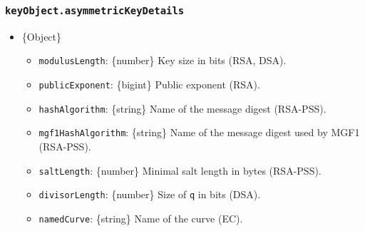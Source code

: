 \begin{Shaded}
\begin{Highlighting}[]
\OperatorTok{=} \NormalTok{(}\NormalTok{)}\OperatorTok{;}
\OperatorTok{=}\OperatorTok{;}

\NormalTok{(} \NormalTok{() \{}
  \OperatorTok{=} \NormalTok{(\{}
    \OperatorTok{:} \OperatorTok{,}
    \OperatorTok{:} \OperatorTok{,}
    \OperatorTok{:} \OperatorTok{,}
\NormalTok{  \}}\OperatorTok{,} \OperatorTok{,}\NormalTok{ [}\OperatorTok{,} \NormalTok{])}\OperatorTok{;}

  \OperatorTok{=}\OperatorTok{;}
  \NormalTok{)}\OperatorTok{;}
\NormalTok{\})()}\OperatorTok{;}
\end{Highlighting}
\end{Shaded}

\subsubsection{\texorpdfstring{\texttt{keyObject.asymmetricKeyDetails}}{keyObject.asymmetricKeyDetails}}\label{keyobject.asymmetrickeydetails}

\begin{itemize}
\tightlist
\item
  \{Object\}

  \begin{itemize}
  \tightlist
  \item
    \texttt{modulusLength}: \{number\} Key size in bits (RSA, DSA).
  \item
    \texttt{publicExponent}: \{bigint\} Public exponent (RSA).
  \item
    \texttt{hashAlgorithm}: \{string\} Name of the message digest
    (RSA-PSS).
  \item
    \texttt{mgf1HashAlgorithm}: \{string\} Name of the message digest
    used by MGF1 (RSA-PSS).
  \item
    \texttt{saltLength}: \{number\} Minimal salt length in bytes
    (RSA-PSS).
  \item
    \texttt{divisorLength}: \{number\} Size of \texttt{q} in bits (DSA).
  \item
    \texttt{namedCurve}: \{string\} Name of the curve (EC).
  \end{itemize}
\end{itemize}

